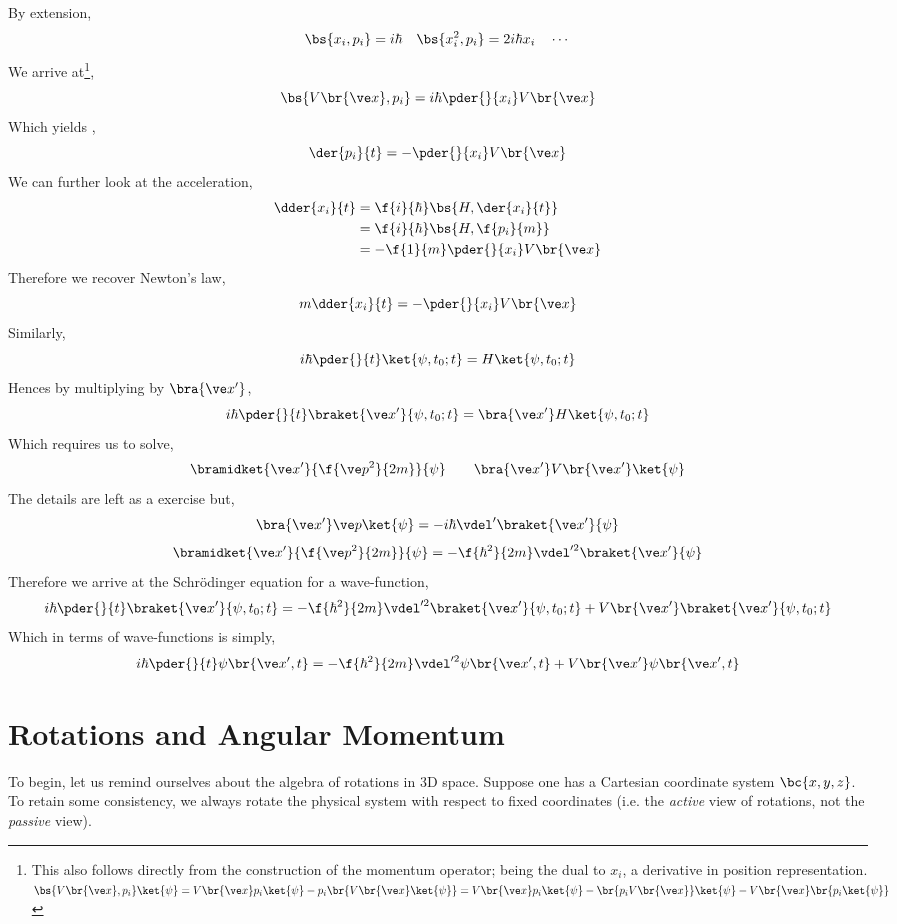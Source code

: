 \documentclass{article}
\begin{document}
By extension,
\[ \bs{x_i, p_i} = i\hbar \quad \bs{x_i^2, p_i} = 2i\hbar x_i \quad \cdots \]
We arrive at\footnote{This also follows directly from the construction of the momentum operator; being the dual to $x_i$, a derivative in position representation. $\bs{V\br{\ve x}, p_i}\ket{\psi} = V\br{\ve x} p_i \ket{\psi} -  p_i\br{V\br{\ve x} \ket{\psi}} = V\br{\ve x} p_i \ket{\psi} -  \br{p_iV\br{\ve x}} \ket{\psi} - V\br{\ve x} \br{p_i\ket{\psi}}$},
\[ \bs{V\br{\ve x}, p_i} = i \hbar \pder{}{x_i} V\br{\ve x} \]
Which yields ,
\[ \der{p_i}{t} = - \pder{}{x_i} V\br{\ve x} \]
We can further look at the acceleration,
\begin{align*}
    \dder{x_i}{t} &= \f{i}{\hbar}\bs{H, \der{x_i}{t}} \\
    &= \f{i}{\hbar}\bs{H, \f{p_i}{m}} \\
    &= -\f{1}{m} \pder{}{x_i} V\br{\ve x}
\end{align*}
Therefore we recover Newton's law,
\[ m \dder{x_i}{t} = - \pder{}{x_i} V\br{\ve x} \]
Similarly,
\[ i \hbar \pder{}{t} \ket{\psi, t_0;t} = H\ket{\psi, t_0;t} \]
Hences by multiplying by $\bra{\ve x'}$,
\[ i \hbar \pder{}{t} \braket{\ve x'}{\psi, t_0;t} =\bra{\ve x'} H\ket{\psi, t_0;t} \]
Which requires us to solve,
\[ \bramidket{\ve x'}{\f{\ve p^2}{2m}}{\psi} \qquad \bra{\ve x'} V\br{\ve x'} \ket{\psi} \]
The details are left as a exercise but,
\[ \bra{\ve x'} \ve p \ket{\psi} = - i \hbar \vdel' \braket{\ve x'}{\psi} \]
\[ \bramidket{\ve x'}{\f{\ve p^2}{2m}}{\psi} = -\f{\hbar^2}{2m} \vdel'^2 \braket{\ve x'}{\psi} \]
Therefore we arrive at the Schrödinger equation for a wave-function,
\[ i \hbar \pder{}{t} \braket{\ve x'}{\psi, t_0;t} = -\f{\hbar^2}{2m} \vdel'^2\braket{\ve x'}{\psi, t_0;t} + V\br{\ve x'} \braket{\ve x'}{\psi, t_0; t}\]
Which in terms of wave-functions is simply,
\[ i \hbar \pder{}{t} \psi\br{\ve x', t} = -\f{\hbar^2}{2m} \vdel'^2\psi\br{\ve x', t} + V\br{\ve x'} \psi\br{\ve x', t}\]
\section{Rotations and Angular Momentum}
To begin, let us remind ourselves about the algebra of rotations in 3D space. Suppose one has a Cartesian coordinate system $\bc{x,y,z}$. To retain some consistency, we always rotate the physical system with respect to fixed coordinates (i.e. the \textit{active} view of rotations, not the \textit{passive} view). \\
\end{document}
